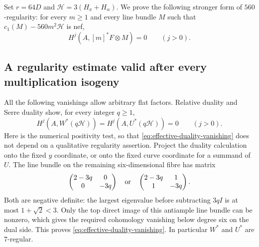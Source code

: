 \documentclass[11pt]{article}
\theoremstyle{definition}
\theoremstyle{remark}
\begin{document}
Set $r=64D$ and $\mathcal H=3(H_x+H_\alpha)$. We prove the following stronger form of $560$-regularity: for every $m\ge1$ and every line bundle $M$ such that $c_1(M)-560m^2\mathcal H$ is nef,
\begin{equation}\label{eq:effective-vanishing}
 H^j(A,[m]^*F\otimes M)=0\qquad(j>0).
\end{equation}
\subsection{A regularity estimate valid after every multiplication isogeny}
All the following vanishings allow arbitrary flat factors.
Relative duality and Serre duality show, for every integer $q\ge1$,
\begin{equation}\label{eq:effective-duality-vanishing}
 H^j(A,W^*(q\mathcal H))=H^j(A,U^*(q\mathcal H))=0
 \qquad(j>0).                                             
\end{equation}
Here is the numerical positivity test, so that \eqref{eq:effective-duality-vanishing} does not
depend on a qualitative regularity assertion. Project the duality
calculation onto the fixed $y$ coordinate, or onto the fixed curve
coordinate for a summand of $U$. The line bundle on the remaining
six-dimensional fibre has matrix
\[
 \begin{pmatrix}2-3q&0\\0&-3q\end{pmatrix}
 \quad\hbox{or}\quad
 \begin{pmatrix}2-3q&1\\1&-3q\end{pmatrix}.
\]
Both are negative definite: the largest eigenvalue before
subtracting $3qI$ is at most $1+\sqrt2<3$. Only the top direct
image of this antiample line bundle can be nonzero, which gives
the required cohomology vanishing below degree six on the dual
side. This proves \eqref{eq:effective-duality-vanishing}. In particular $W^*$ and $U^*$ are
$7$-regular.
\end{document}

